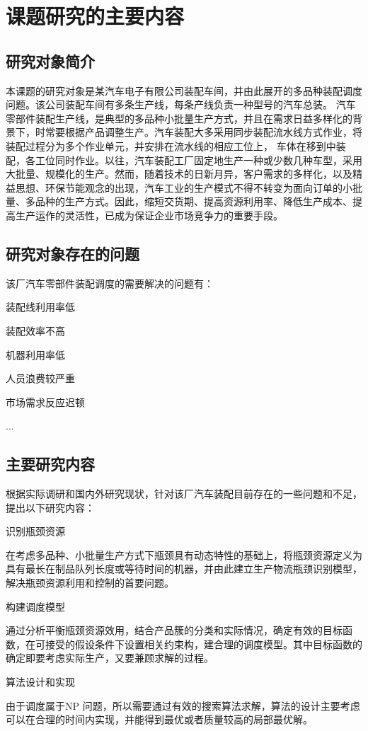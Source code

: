 \chapter{课题研究的主要内容}
\section{研究对象简介}
本课题的研究对象是某汽车电子有限公司装配车间，并由此展开的多品种装配调度问题。该公司装配车间有多条生产线，每条产线负责一种型号的汽车总装。
汽车零部件装配生产线，是典型的多品种小批量生产方式，并且在需求日益多样化的背景下，时常要根据产品调整生产。汽车装配大多采用同步装配流水线方式作业，将装配过程分为多个作业单元，并安排在流水线的相应工位上，
车体在移到中装配，各工位同时作业。以往，汽车装配工厂固定地生产一种或少数几种车型，采用大批量、规模化的生产。然而，随着技术的日新月异，客户需求的多样化，以及精益思想、环保节能观念的出现，汽车工业的生产模式不得不转变为面向订单的小批量、多品种的生产方式。因此，缩短交货期、提高资源利用率、降低生产成本、提高生产运作的灵活性，已成为保证企业市场竞争力的重要手段。

\section{研究对象存在的问题}
该厂汽车零部件装配调度的需要解决的问题有：
\begin{asparaenum}[(1)]
\item 装配线利用率低
\item 装配效率不高
\item 机器利用率低
\item 人员浪费较严重
\item 市场需求反应迟顿
\item ...
\end{asparaenum}

\section{主要研究内容}
根据实际调研和国内外研究现状，针对该厂汽车装配目前存在的一些问题和不足，提出以下研究内容：
\renewcommand{\labelenumi}{(\theenumi)}
\begin{asparaenum}
\item 识别瓶颈资源

在考虑多品种、小批量生产方式下瓶颈具有动态特性的基础上，将瓶颈资源定义为具有最长在制品队列长度或等待时间的机器，并由此建立生产物流瓶颈识别模型，解决瓶颈资源利用和控制的首要问题。
\item 构建调度模型

通过分析平衡瓶颈资源效用，结合产品簇的分类和实际情况，确定有效的目标函数，在可接受的假设条件下设置相关约束构，建合理的调度模型。其中目标函数的确定即要考虑实际生产，又要兼顾求解的过程。
\item 算法设计和实现
\end{asparaenum}

由于调度属于NP 问题，所以需要通过有效的搜索算法求解，算法的设计主要考虑可以在合理的时间内实现，并能得到最优或者质量较高的局部最优解。